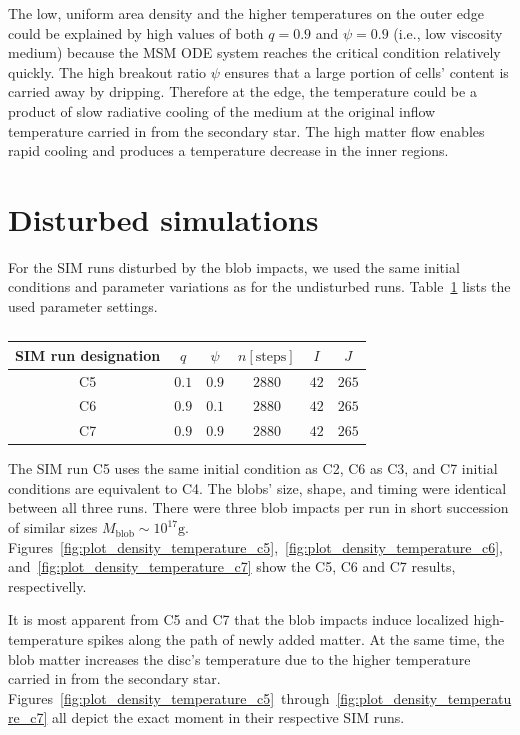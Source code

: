     The low, uniform area density and the higher temperatures on the outer edge could be explained by high values of both $q = 0.9$ and $\psi = 0.9$ (i.e., low viscosity medium) because the MSM ODE system reaches the critical condition relatively quickly. The high breakout ratio $\psi$ ensures that a large portion of cells' content is carried away by dripping. Therefore at the edge, the temperature could be a product of slow radiative cooling of the medium at the original inflow temperature carried in from the secondary star. The high matter flow enables rapid cooling and produces a temperature decrease in the inner regions.

\section{Disturbed simulations}
    For the SIM runs disturbed by the blob impacts, we used the same initial conditions and parameter variations as for the undisturbed runs. Table~\ref{tab:table_simultation_cases_disturbed} lists the used parameter settings.

    \begin{table}[ht]
    \centering
    \begin{tabular*}{\columnwidth}{@{\extracolsep{\fill}}cccccc}
        SIM run designation & $q$ & $\psi$ & $n [\mathrm{steps}]$ & $I$ & $J$ \\ 
    \hline\hline
        C5 & $0.1$ & $0.9$ & $2880$ & $42$ & $265$ \\
        C6 & $0.9$ & $0.1$ & $2880$ & $42$ & $265$ \\
        C7 & $0.9$ & $0.9$ & $2880$ & $42$ & $265$ \\
    \hline
    \end{tabular*}
    \caption{}
    \label{tab:table_simultation_cases_disturbed}
    \end{table}

    The SIM run C5 uses the same initial condition as C2, C6 as C3, and C7 initial conditions are equivalent to C4. The blobs' size, shape, and timing were identical between all three runs. There were three blob impacts per run in short succession of similar sizes $M_{\mathrm{blob}}\sim 10^{17} \si{\gram}$. Figures~\ref{fig:plot_density_temperature_c5},~\ref{fig:plot_density_temperature_c6},~and~\ref{fig:plot_density_temperature_c7} show the C5, C6 and C7 results, respectivelly.

    It is most apparent from C5 and C7 that the blob impacts induce localized high-temperature spikes along the path of newly added matter. At the same time, the blob matter increases the disc's temperature due to the higher temperature carried in from the secondary star. Figures~\ref{fig:plot_density_temperature_c5}~through~\ref{fig:plot_density_temperature_c7} all depict the exact moment in their respective SIM runs.

